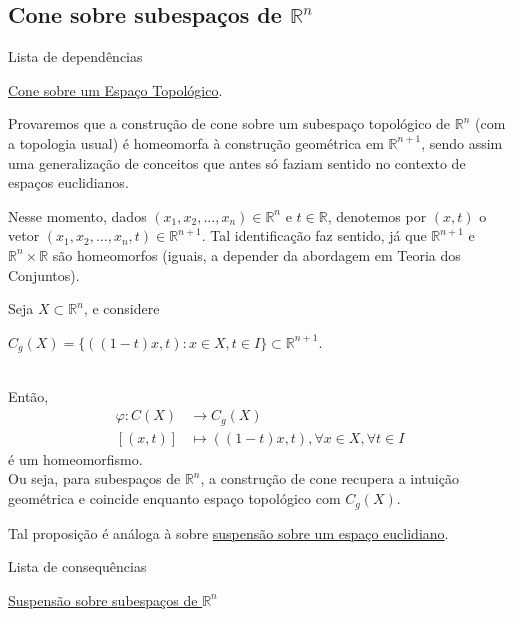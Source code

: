\subsection{Cone sobre subespaços de $\mathbb{R}^n$}
\label{cone-euclidiano-prop}
\begin{titlemize}{Lista de dependências}
	\item \hyperref[cone-def]{Cone sobre um Espaço Topológico}.
\end{titlemize}
Provaremos que a construção de cone sobre um subespaço topológico de $\mathbb{R}^n$ (com a topologia usual) é homeomorfa à construção geométrica em $\mathbb{R}^{n+1}$, sendo assim uma generalização de conceitos que antes só faziam sentido no contexto de espaços euclidianos.

Nesse momento, dados $(x_1,x_2,...,x_n) \in \mathbb{R}^n$ e $t \in \mathbb{R}$, denotemos por $(x,t)$ o vetor $(x_1,x_2,...,x_n,t) \in \mathbb{R}^{n+1}$. Tal identificação faz sentido, já que $\mathbb{R}^{n+1}$ e $\mathbb{R}^{n}\times\mathbb{R}$ são homeomorfos (iguais, a depender da abordagem em Teoria dos Conjuntos).

\begin{prop}
	Seja $X \subset \mathbb{R}^n$, e considere\\
    \centerline{$C_g(X) = \{((1-t)x,t):x\in X, t\in I\} \subset \mathbb{R}^{n+1}$.}\\
    Então,\begin{align*}
        \varphi: C(X) &\rightarrow C_g(X)\\
        [(x,t)] &\mapsto ((1-t)x,t), \forall x\in X, \forall t \in I
    \end{align*}
    é um homeomorfismo.\\
    Ou seja, para subespaços de $\mathbb{R}^n$, a construção de cone recupera a intuição geométrica e coincide enquanto espaço topológico com $C_g(X)$.
\end{prop}

Tal proposição é análoga à sobre \hyperref[suspensao-euclidiano-prop]{suspensão sobre um espaço euclidiano}.

\begin{titlemize}{Lista de consequências}
    \item \hyperref[suspensao-euclidiano-prop]{Suspensão sobre subespaços de $\mathbb{R}^n$}
\end{titlemize}